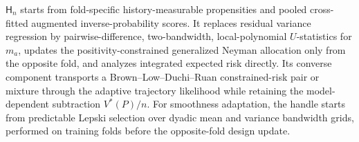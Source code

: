 \(\mathsf H_n\) starts from fold-specific history-measurable propensities and pooled cross-fitted augmented inverse-probability scores. It replaces residual variance regression by pairwise-difference, two-bandwidth, local-polynomial \(U\)-statistics for \(m_a\), updates the positivity-constrained generalized Neyman allocation only from the opposite fold, and analyzes integrated expected risk directly. Its converse component transports a Brown--Low--Duchi--Ruan constrained-risk pair or mixture through the adaptive trajectory likelihood while retaining the model-dependent subtraction \(V^*(P)/n\). For smoothness adaptation, the handle starts from predictable Lepski selection over dyadic mean and variance bandwidth grids, performed on training folds before the opposite-fold design update.